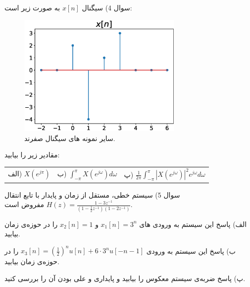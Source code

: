 \documentclass{article}
\begin{document}
\newpage

سوال 4) سیگنال 
$
x[n]
$
به صورت زیر است:
\begin{figure}[h]
\centering
\includegraphics[width=80mm]{Final-Q3.eps}
\captionsetup{labelformat=empty}
\caption{
سایر نمونه های سیگنال صفرند.
}
\end{figure}

مقادیر زیر را بیابید:
\begin{table}[h]
\begin{tabular}{ccc}
الف) 
$
X(e^{j\pi})
$
&
\hspace{25mm}
ب)
$
\int_{-\pi}^{\pi}X(e^{j\omega})d\omega
$
&
\hspace{25mm}
پ)
$
\frac{1}{2\pi}\int_{-\pi}^{\pi}|X(e^{j\omega})|^2e^{j\omega}d\omega
$
\end{tabular}
\end{table}

\hrulefill

سوال 5) سیستم خطی، مستقل از زمان و پایدار با تابع انتقال
$
H(z)=
\frac{1-3z^{-1}}{\left(1-\frac{1}{2}z^{-1}\right)(1-2z^{-1})}
$
مفروض است.

الف) پاسخ این سیستم به ورودی های 
$
x_1[n]=3^n
$
و
$
x_2[n]=1
$
را در حوزه‌ی زمان بیابید.

ب) پاسخ این سیستم به ورودی
$
x_3[n]=
\left(\frac{1}{2}\right)^nu[n]
+6\cdot 3^nu[-n-1]
$
را در حوزه‌ی زمان بیابید.

پ) پاسخ ضربه‌ی سیستم معکوس را بیابید و پایداری و علی بودن آن را بررسی کنید.
\end{document}
